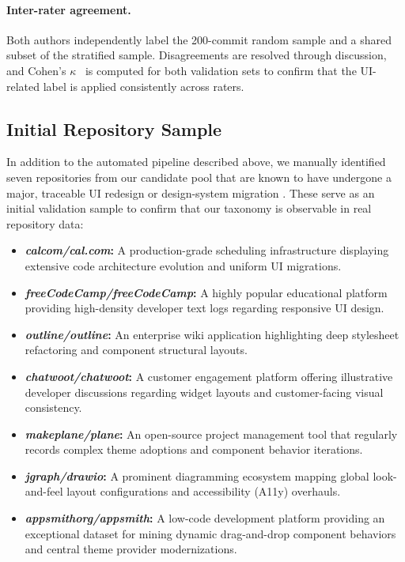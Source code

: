\documentclass{article}
\begin{document}
\paragraph{Inter-rater agreement.}
Both authors independently label the 200-commit random sample and a
shared subset of the stratified sample. Disagreements are resolved
through discussion, and Cohen's $\kappa$~\cite{cohen1960} is computed
for both validation sets to confirm that the UI-related label is applied
consistently across raters.

\newpage
\subsection{Initial Repository Sample}
\label{sec:initial-sample}

In addition to the automated pipeline described above, we manually
identified seven repositories from our candidate pool that are known to
have undergone a major, traceable UI redesign or design-system migration
\cite{appsmith, drawio, plane, chatwoot, outline, freecodecamp, calcom}.
These serve as an initial validation sample to confirm that our taxonomy
is observable in real repository data:

\begin{itemize}
    \item \textbf{\textit{calcom/cal.com}:} A production-grade scheduling
    infrastructure displaying extensive code architecture evolution and
    uniform UI migrations.
    \item \textbf{\textit{freeCodeCamp/freeCodeCamp}:} A highly popular
    educational platform providing high-density developer text logs
    regarding responsive UI design.
    \item \textbf{\textit{outline/outline}:} An enterprise wiki application
    highlighting deep stylesheet refactoring and component structural layouts.
    \item \textbf{\textit{chatwoot/chatwoot}:} A customer engagement platform
    offering illustrative developer discussions regarding widget layouts and
    customer-facing visual consistency.
    \item \textbf{\textit{makeplane/plane}:} An open-source project management
    tool that regularly records complex theme adoptions and component behavior
    iterations.
    \item \textbf{\textit{jgraph/drawio}:} A prominent diagramming ecosystem
    mapping global look-and-feel layout configurations and accessibility
    (A11y) overhauls.
    \item \textbf{\textit{appsmithorg/appsmith}:} A low-code development
    platform providing an exceptional dataset for mining dynamic
    drag-and-drop component behaviors and central theme provider
    modernizations.
\end{itemize}
\end{document}
